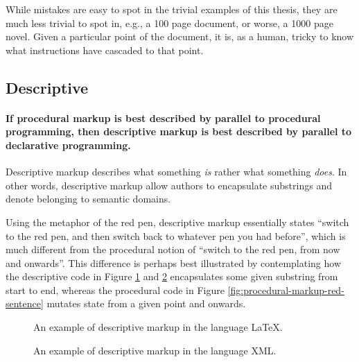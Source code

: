 \documentclass{scrreprt}
\begin{document}
While mistakes are easy to spot in the trivial examples of this thesis, they are much less trivial to spot in, e.g., a 100 page document, or worse, a 1000 page novel. Given a particular point of the document, it is, as a human, tricky to know what instructions have cascaded to that point.




\subsection{Descriptive}
\label{sec:taxonomy-descriptive}
\paragraph{If procedural markup is best described by parallel to procedural programming, then descriptive markup is best described by parallel to declarative programming.} Descriptive markup describes what something \emph{is} rather what something \emph{does}. In other words, descriptive markup allow authors to encapsulate substrings and denote belonging to semantic domains.


Using the metaphor of the red pen, descriptive markup essentially states ``switch to the red pen, and then switch back to whatever pen you had before'', which is much different from the procedural notion of ``switch to the red pen, from now and onwards''. This difference is perhaps best illustrated by contemplating how the descriptive code in Figure \ref{fig:descriptive-markup-red-sentence-latex} and \ref{fig:descriptive-markup-red-sentence-xml} encapsulates some given substring from start to end, whereas the procedural code in Figure \ref{fig:procedural-markup-red-sentence} mutates state from a given point and onwards.

\begin{figure}[h]
\centering
{}
\caption{An example of descriptive markup in the language \LaTeX{}.}
\label{fig:descriptive-markup-red-sentence-latex}
\end{figure}



\begin{figure}[h]
\centering
{}
\caption{An example of descriptive markup in the language XML.}
\label{fig:descriptive-markup-red-sentence-xml}
\end{figure}
\end{document}
